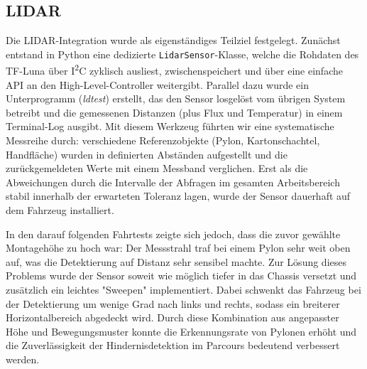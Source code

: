 \documentclass[main.tex]{subfiles} %
\begin{document}
\subsection*{LIDAR}
Die LIDAR-Integration wurde als eigenständiges Teilziel
festgelegt. Zunächst entstand in Python eine dedizierte
\texttt{LidarSensor}-Klasse, welche die Rohdaten des TF-Luna über
I\textsuperscript{2}C zyklisch ausliest, zwischenspeichert und über eine
einfache API an den High-Level-Controller weitergibt. Parallel dazu
wurde ein Unterprogramm (\textit{ldtest}) erstellt, das den Sensor
losgelöst vom übrigen System betreibt und die gemessenen Distanzen
(plus Flux und Temperatur) in
einem Terminal-Log ausgibt. Mit diesem Werkzeug führten wir eine
systematische Messreihe durch: verschiedene Referenzobjekte (Pylon,
Kartonschachtel, Handfläche) wurden in definierten Abständen aufgestellt
und die zurückgemeldeten Werte mit einem Messband
verglichen. Erst als die Abweichungen durch die Intervalle der
Abfragen im gesamten Arbeitsbereich stabil
innerhalb der erwarteten Toleranz lagen, wurde der Sensor dauerhaft auf
dem Fahrzeug installiert.

In den darauf folgenden Fahrtests zeigte sich jedoch, dass die zuvor
gewählte Montagehöhe zu hoch war: Der Messstrahl traf bei einem Pylon
sehr weit oben auf, was die Detektierung auf Distanz sehr sensibel machte.
Zur Lösung dieses Problems wurde der Sensor soweit wie möglich tiefer
in das Chassis versetzt und zusätzlich ein leichtes
"Sweepen" implementiert. Dabei schwenkt das Fahrzeug bei der
Detektierung um wenige Grad nach links und rechts,
sodass ein breiterer Horizontalbereich abgedeckt wird. Durch diese
Kombination aus angepasster Höhe und Bewegungsmuster konnte die
Erkennungsrate von Pylonen erhöht und die Zuverlässigkeit
der Hindernisdetektion im Parcours bedeutend verbessert werden.
\end{document}
